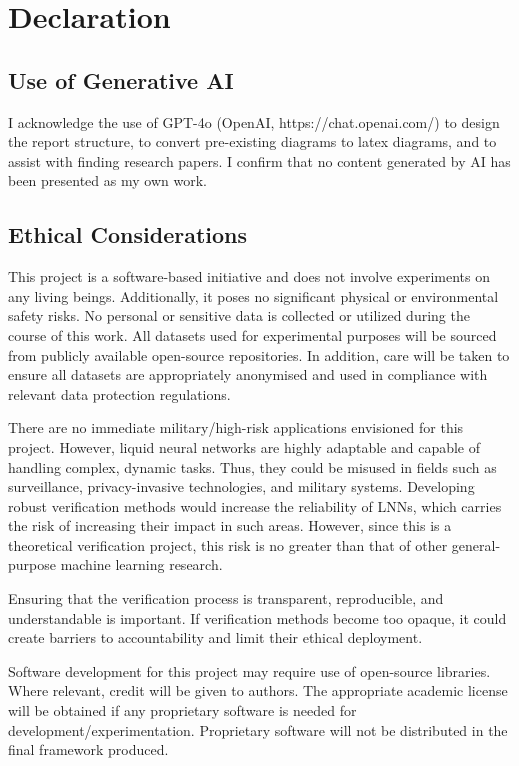 \chapter{Declaration}

\section{Use of Generative AI}

I acknowledge the use of GPT-4o (OpenAI, https://chat.openai.com/) to design the report structure, to convert pre-existing diagrams to latex diagrams, and to assist with finding research papers. I confirm that no content generated by AI has been presented as my own work. 

\section{Ethical Considerations}

This project is a software-based initiative and does not involve experiments on any living beings. Additionally, it poses no significant physical or environmental safety risks. No personal or sensitive data is collected or utilized during the course of this work. All datasets used for experimental purposes will be sourced from publicly available open-source repositories. In addition, care will be taken to ensure all datasets are appropriately anonymised and used in compliance with relevant data protection regulations.

There are no immediate military/high-risk applications envisioned for this project. However, liquid neural networks are highly adaptable and capable of handling complex, dynamic tasks. Thus, they could be misused in fields such as surveillance, privacy-invasive technologies, and military systems. Developing robust verification methods would increase the reliability of LNNs, which carries the risk of increasing their impact in such areas. However, since this is a theoretical verification project, this risk is no greater than that of other general-purpose machine learning research.

Ensuring that the verification process is transparent, reproducible, and understandable is important. If verification methods become too opaque, it could create barriers to accountability and limit their ethical deployment.

Software development for this project may require use of open-source libraries. Where relevant, credit will be given to authors. The appropriate academic license will be obtained if any proprietary software is needed for development/experimentation. Proprietary software will not be distributed in the final framework produced.

